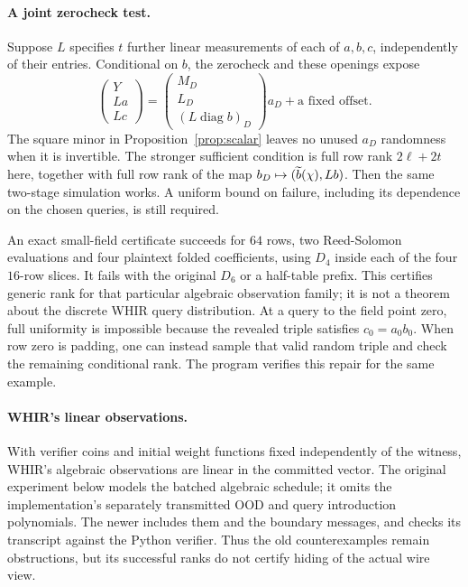 \documentclass[11pt]{article}
\begin{document}
\paragraph{A joint zerocheck test.} Suppose $L$ specifies $t$ further linear measurements of each of $a,b,c$, independently of their entries. Conditional on $b$, the zerocheck and these openings expose
\[
 \begin{pmatrix}Y\\La\\Lc\end{pmatrix}
 =
 \begin{pmatrix}M_D\\L_D\\(L\operatorname{diag}b)_D\end{pmatrix}a_D
 +\text{a fixed offset}.
\]
The square minor in Proposition~\ref{prop:scalar} leaves no unused $a_D$ randomness when it is invertible. The stronger sufficient condition is full row rank $2\ell+2t$ here, together with full row rank of the map $b_D\mapsto(\widetilde{b}(\chi),Lb)$. Then the same two-stage simulation works. A uniform bound on failure, including its dependence on the chosen queries, is still required.

An exact small-field certificate succeeds for $64$ rows, two Reed-Solomon evaluations and four plaintext folded coefficients, using $D_4$ inside each of the four $16$-row slices. It fails with the original $D_6$ or a half-table prefix. This certifies generic rank for that particular algebraic observation family; it is not a theorem about the discrete WHIR query distribution. At a query to the field point zero, full uniformity is impossible because the revealed triple satisfies $c_0=a_0b_0$. When row zero is padding, one can instead sample that valid random triple and check the remaining conditional rank. The program verifies this repair for the same example.

\paragraph{WHIR's linear observations.} With verifier coins and initial weight functions fixed independently of the witness, WHIR's algebraic observations are linear in the committed vector. The original experiment below models the batched algebraic schedule; it omits the implementation's separately transmitted OOD and query introduction polynomials. The newer  includes them and the boundary messages, and checks its transcript against the Python verifier. Thus the old counterexamples remain obstructions, but its successful ranks do not certify hiding of the actual wire view.
\end{document}
